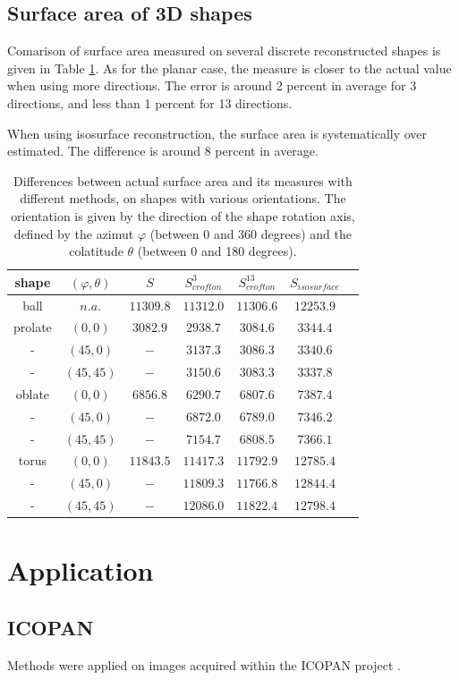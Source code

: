 \documentclass{InsightArticle}
\begin{document}

\subsection{Surface area of 3D shapes}

Comarison of surface area measured on several discrete reconstructed shapes is given in
Table \ref{tab:CompareSurfaceArea}.
As for the planar case, the measure is closer to the actual value when using more
directions. The error is around 2 percent in average for 3 directions, and less than
1 percent for 13 directions.

When using isosurface reconstruction, the surface area is systematically over estimated.
The difference is around 8 percent in average.

\begin{table}[!htb]
\begin{center}\begin{tabular}{ccccccc}
shape	& $(\varphi,\theta)$ & $S$ 	& $S_{crofton}^3$ & $S_{crofton}^{13}$ & $S_{isosurface}$ \tabularnewline \hline 
ball 		& $n.a.$  		& 	$11309.8$	& $11312.0$ 	& $11306.6$ 	& $12253.9$ 	\tabularnewline 
prolate	& $( 0,  0)$  	& 	$3082.9$ 	& $2938.7$ 	& $3084.6$ 	& $3344.4$ 	\tabularnewline
- 			& $(45,  0)$  	& 	$-$ 		& $3137.3$ 	& $3086.3$ 	& $3340.6$ 	\tabularnewline
- 			& $(45, 45)$  	& 	$-$ 		& $3150.6$ 	& $3083.3$ 	& $3337.8$ 	\tabularnewline
oblate 	& $( 0,  0)$  	& 	$6856.8$ 	& $6290.7$ 	& $6807.6$ 	& $7387.4$ 	\tabularnewline
- 			& $(45,  0)$  	& 	$-$ 		& $6872.0$ 	& $6789.0$ 	& $7346.2$ 	\tabularnewline
- 			& $(45, 45)$  	& 	$-$ 		& $7154.7$ 	& $6808.5$ 	& $7366.1$ 	\tabularnewline
torus 		& $( 0,  0)$  	& 	$11843.5$	& $11417.3$ 	& $11792.9$ 	& $12785.4$ 	\tabularnewline
-			& $(45,  0)$  	& 	$-$    	& $11809.3$ 	& $11766.8$ 	& $12844.4$ 	\tabularnewline
- 			& $(45, 45)$ 	& 	$-$ 	 	& $12086.0$ 	& $11822.4$ 	& $12798.4$ 	\tabularnewline
\end{tabular}\end{center}
\caption{ \label{tab:CompareSurfaceArea}
Differences between actual surface area and its measures with different methods, 
on shapes with various orientations.
The orientation is given by the direction of the shape rotation axis, defined by 
the azimut $\varphi$ (between 0 and 360 degrees) and the colatitude $\theta$ (between 0 and 180 degrees).}
\end{table}



\section{Application}

\subsection{ICOPAN}

Methods were applied on images acquired within the ICOPAN project \cite{Andrey2010}.

\appendix





\nocite{ITKSoftwareGuide}
\end{document}
